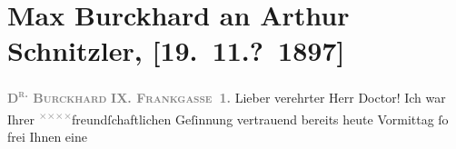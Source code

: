 

         
         \renewcommand{\erwaehntePersonen}{Personen: Max Eugen Burckhard}
         \renewcommand{\erwaehnteOrte}{Orte: Frankgasse 1, Volkstheater, Wien}
         \renewcommand{\erwaehnteWerke}{Werke: Die Bürgermeisterwahl. Ländliche Comödie in vier Acten, ’s Katherl. Volksstück in fünf Aufzügen}
               \section[Max Burckhard an Arthur Schnitzler, {[}19. 11.? 1897{]}]{ Max Burckhard an Arthur Schnitzler, {[}19. 11.? 1897{]}}\nopagebreak{}\rehead{ }\begin{ledgroupsized}[t]{13cm}\normalsize\beginnumbering \toendnotes[C]{\smallbreak\pagebreak[2]} 
\toendnotes[C]{\smallbreak}\pstart
           \noindent{}{\pb}\textcolor{gray}{\textbf{\textsc{D\textsuperscript{r.} Burckhard}}}\pend
           \pstart
           \textcolor{gray}{\textbf{\textsc{IX. Frankgasse 1.}}}\pend
           \pstart{}{\pb}Lieber verehrter Herr Doctor!\pend\pstart
           Ich war Ihrer \substVorne{}\textsuperscript{\textcolor{gray}{×}\-\textcolor{gray}{×}\-\textcolor{gray}{×}\-\textcolor{gray}{×}}\substDazwischen{}freund\substHinten{}ſchaftlichen Geſinnung vertrauend bereits heute Vormittag ſo frei Ihnen eine
                  \label{K_L00744-1v}
\end{ledgroupsized}
